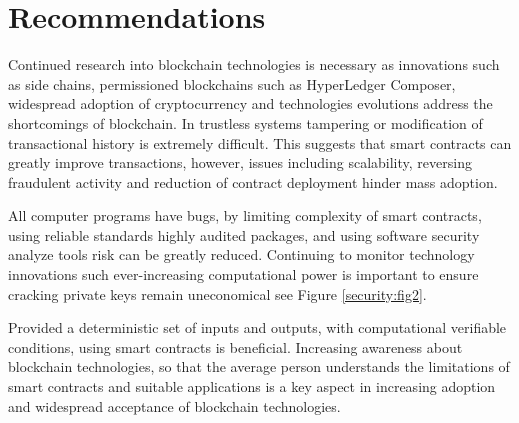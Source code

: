  \section{Recommendations}
 
 
  
Continued research into \gls{blockchain} technologies is necessary as innovations such as \gls{side chains}, permissioned blockchains such as \gls{HyperLedger Composer}, widespread adoption of cryptocurrency and technologies evolutions address the shortcomings of blockchain. In trustless systems tampering or modification of transactional history is extremely difficult. This suggests that smart contracts can greatly improve transactions, however, issues including scalability, reversing fraudulent activity and reduction of contract deployment hinder mass adoption.

All computer programs have bugs, by limiting complexity of smart contracts,  using reliable standards highly audited packages, and using software security analyze tools risk can be greatly reduced. Continuing to monitor technology innovations such ever-increasing computational power is important to ensure cracking private keys remain uneconomical see Figure \ref{security:fig2}. 

Provided a deterministic set of inputs and outputs, with computational verifiable conditions, using smart contracts is beneficial.
Increasing awareness about \gls{blockchain} technologies, so that the average person understands the limitations of smart contracts and suitable applications is a key aspect in increasing adoption and widespread acceptance of \gls{blockchain} technologies.

\newpage